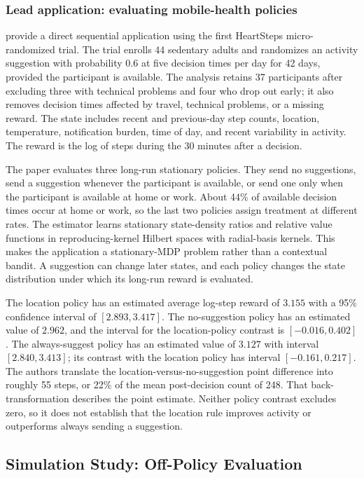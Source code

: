 \subsubsection*{Lead application: evaluating mobile-health policies}

\citet{liaoMurphy2021longterm} provide a direct sequential application using the first HeartSteps micro-randomized trial. The trial enrolls 44 sedentary adults and randomizes an activity suggestion with probability $0.6$ at five decision times per day for 42 days, provided the participant is available. The analysis retains 37 participants after excluding three with technical problems and four who drop out early; it also removes decision times affected by travel, technical problems, or a missing reward. The state includes recent and previous-day step counts, location, temperature, notification burden, time of day, and recent variability in activity. The reward is the log of steps during the 30 minutes after a decision.

The paper evaluates three long-run stationary policies. They send no suggestions, send a suggestion whenever the participant is available, or send one only when the participant is available at home or work. About 44\% of available decision times occur at home or work, so the last two policies assign treatment at different rates. The estimator learns stationary state-density ratios and relative value functions in reproducing-kernel Hilbert spaces with radial-basis kernels. This makes the application a stationary-MDP problem rather than a contextual bandit. A suggestion can change later states, and each policy changes the state distribution under which its long-run reward is evaluated.

The location policy has an estimated average log-step reward of $3.155$ with a 95\% confidence interval of $[2.893,3.417]$. The no-suggestion policy has an estimated value of $2.962$, and the interval for the location-policy contrast is $[-0.016,0.402]$. The always-suggest policy has an estimated value of $3.127$ with interval $[2.840,3.413]$; its contrast with the location policy has interval $[-0.161,0.217]$. The authors translate the location-versus-no-suggestion point difference into roughly 55 steps, or 22\% of the mean post-decision count of 248. That back-transformation describes the point estimate. Neither policy contrast excludes zero, so it does not establish that the location rule improves activity or outperforms always sending a suggestion.

\subsection{Simulation Study: Off-Policy Evaluation}
\label{subsec:sim_ope}

